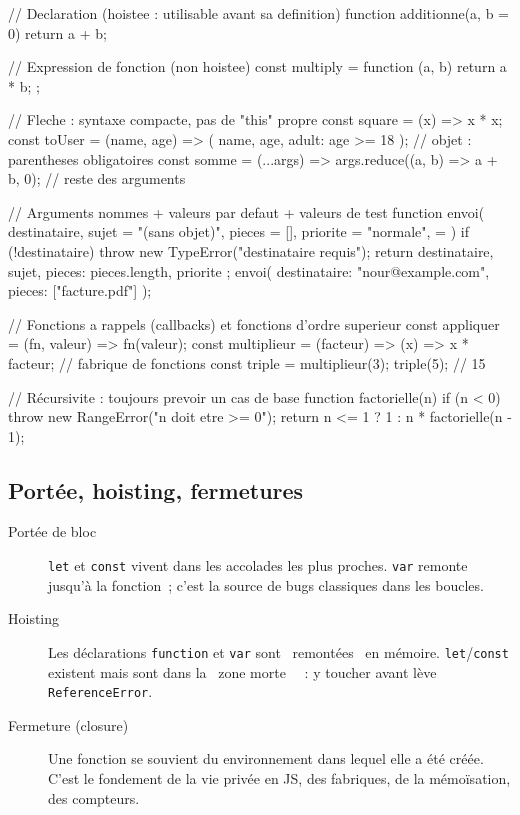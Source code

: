 \begin{codejs}
// Declaration (hoistee : utilisable avant sa definition)
function additionne(a, b = 0) { return a + b; }

// Expression de fonction (non hoistee)
const multiply = function (a, b) { return a * b; };

// Fleche : syntaxe compacte, pas de "this" propre
const square = (x) => x * x;
const toUser = (name, age) => ({ name, age, adult: age >= 18 });  // objet : parentheses obligatoires
const somme = (...args) => args.reduce((a, b) => a + b, 0);       // reste des arguments

// Arguments nommes + valeurs par defaut + valeurs de test
function envoi({
  destinataire,
  sujet = "(sans objet)",
  pieces = [],
  priorite = "normale",
} = {}) {
  if (!destinataire) throw new TypeError("destinataire requis");
  return { destinataire, sujet, pieces: pieces.length, priorite };
}
envoi({ destinataire: "nour@example.com", pieces: ["facture.pdf"] });

// Fonctions a rappels (callbacks) et fonctions d'ordre superieur
const appliquer = (fn, valeur) => fn(valeur);
const multiplieur = (facteur) => (x) => x * facteur;   // fabrique de fonctions
const triple = multiplieur(3); triple(5);               // 15

// R\'ecursivite : toujours prevoir un cas de base
function factorielle(n) {
  if (n < 0) throw new RangeError("n doit etre >= 0");
  return n <= 1 ? 1 : n * factorielle(n - 1);
}
\end{codejs}

\subsection{Port\'ee, hoisting, fermetures}

\begin{description}
  \item[Port\'ee de bloc] \verb|let| et \verb|const| vivent dans les accolades les plus proches.
        \verb|var| remonte jusqu'\`a la fonction~; c'est la source de bugs classiques dans les boucles.
  \item[Hoisting] Les d\'eclarations \verb|function| et \verb|var| sont \og ~remont\'ees~ \fg{} en m\'emoire.
        \verb|let|/\verb|const| existent mais sont dans la \og ~zone morte~ \fg{}~: y toucher avant
        l\`eve \verb|ReferenceError|.
  \item[Fermeture (closure)] Une fonction se souvient du environnement dans lequel elle a \'et\'e
        cr\'e\'ee. C'est le fondement de la vie priv\'ee en JS, des fabriques, de la m\'emo\"isation,
        des compteurs.
\end{description}

